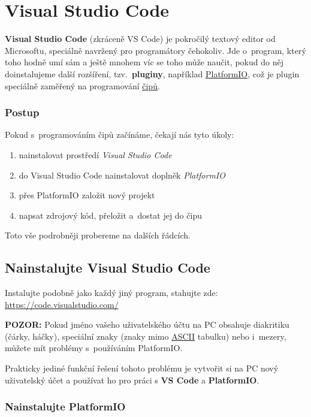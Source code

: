  \section{Visual Studio Code} \label{vscode} 
 
 \textbf{Visual Studio Code} (zkráceně VS Code) je pokročilý textový editor od Microsoftu, speciálně navržený pro programátory čehokoliv.
 Jde o~program, který toho hodně umí sám a ještě mnohem víc se toho může naučit, pokud do něj doinstalujeme další rozšíření, 
 tzv.~\textbf{pluginy}, 
 například  \hyperref[platformio]{PlatformIO}, což je plugin speciálně zaměřený na programování \hyperref[cip]{čipů}. 
 
 \subsubsection*{Postup}
 
 Pokud s~programováním čipů začínáme, čekají nás tyto úkoly:
 \begin{enumerate}
 	\item  nainstalovat prostředí {\it Visual Studio Code}
 	\item  do Visual Studio Code nainstalovat doplněk {\it PlatformIO }
 	\item  přes PlatformIO založit nový projekt
 	\item  napsat zdrojový kód, přeložit a~dostat jej do čipu 
 \end{enumerate}
 Toto vše podrobněji probereme na dalších řádcích. 
 
 \label{vsc} \subsection{Nainstalujte  Visual Studio Code} 
 
 Instalujte podobně jako každý jiný program, stahujte zde: \url{https://code.visualstudio.com/}  
 
 \textbf{POZOR:} Pokud jméno vašeho uživatelského účtu na PC obsahuje diakritiku (čárky, háčky), speciální znaky (znaky mimo \href{https://cs.wikipedia.org/wiki/ASCII}{ASCII} tabulku) nebo i~mezery, můžete mít problémy s~používáním PlatformIO.
 
 Prakticky jediné funkční řešení tohoto problému je vytvořit si na PC nový uživatelský účet a používat ho pro práci s \textbf{VS Code} a \textbf{PlatformIO}. 
 
 
 \subsubsection{Nainstalujte PlatformIO} \label{platformio}
 
